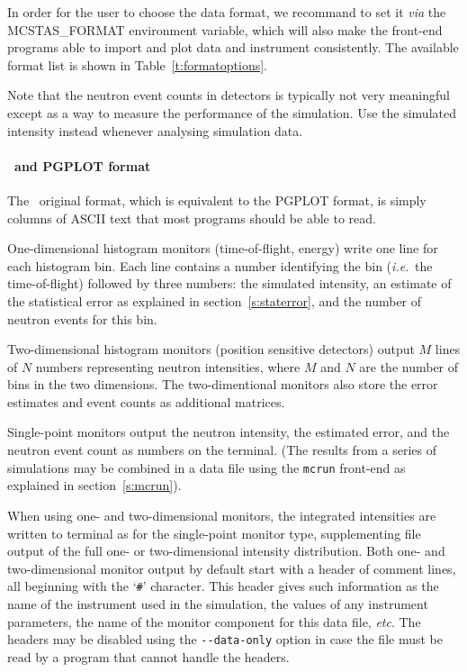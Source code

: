 In order for the user to choose the data format, we recommand to set it {\it via} the MCSTAS\_FORMAT environment variable, which will also make the front-end programs able to import and plot data and instrument consistently. The available format list is shown in Table~\ref{t:formatoptions}. 


Note that the neutron event counts in detectors is typically not very
meaningful except as a way to measure the performance of the
simulation. Use the simulated intensity instead whenever analysing
simulation data.

\paragraph{\MCS\ and PGPLOT format}
 
The \MCS\ original format, which is equivalent to the PGPLOT format, is simply columns of ASCII text that most programs should
be able to read.

One-dimensional histogram monitors (time-of-flight, energy)
write one line for each histogram bin. Each line contains a number
identifying the bin (\textit{i.e}.\ the time-of-flight) followed by
three numbers: the simulated intensity, an estimate of the statistical
error as explained in section~\ref{s:staterror}, and the number of
neutron events for this bin.

Two-dimensional histogram monitors (position sensitive detectors)
output $M$ lines of $N$ numbers representing neutron intensities, where
$M$ and $N$ are the number of bins in the two dimensions. The
two-dimentional monitors also store the error estimates and event counts as additional matrices.

Single-point monitors output the neutron intensity, the estimated
error, and the neutron event count as numbers on the
terminal. (The results from a series of simulations may be combined in a
data file using the \verb+mcrun+ front-end as explained in
section~\ref{s:mcrun}).

When using one- and two-dimensional monitors, the integrated
intensities are written to terminal as for the single-point monitor
type, supplementing file output of the full one- or two-dimensional
intensity distribution. Both one- and two-dimensional monitor output by default start with a
header of comment lines, all beginning with the `\verb+#+' character.
This header gives such information as the name of the instrument used in
the simulation, the values of any instrument parameters, the name of the
monitor component for this data file, \textit{etc}. The headers may be
disabled using the \verb+--data-only+ option in case the file must be
read by a program that cannot handle the headers.

